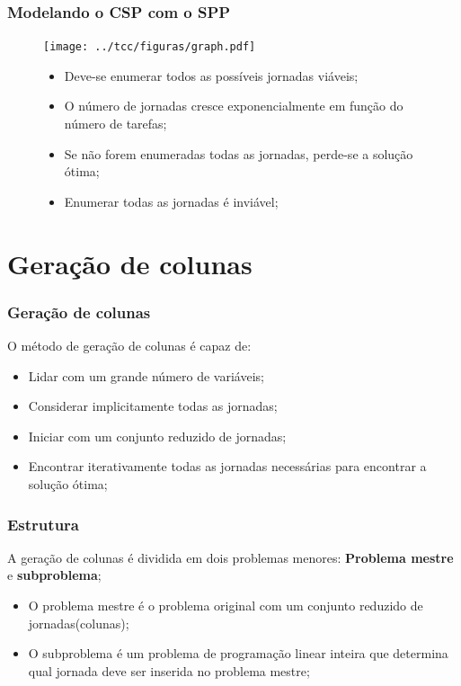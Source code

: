 \documentclass{beamer}
\begin{document}
\begin{frame}
    \frametitle{Modelando o CSP com o SPP}
    \begin{figure}[!htb]
        \centering
        \begin{minipage}{0.48\textwidth}
        {
            \centering
            \texttt{[image: ../tcc/figuras/graph.pdf]}
            \label{treta}
        }
        \end{minipage}
%
        \begin{minipage}{.48\textwidth}
            \begin{itemize}
                \item Deve-se enumerar todos as possíveis jornadas viáveis;
                \item O número de jornadas cresce exponencialmente em função do número de tarefas;
                \item Se não forem enumeradas todas as jornadas, perde-se a solução ótima;
                \item Enumerar todas as jornadas é inviável;
            \end{itemize}
        \end{minipage}
    \end{figure}
\end{frame}

\section{Geração de colunas}
\begin{frame}
    \frametitle{Geração de colunas}
    O método de geração de colunas é capaz de:

    \begin{itemize}
        \item Lidar com um grande número de variáveis;
        \item Considerar implicitamente todas as jornadas;
        \item Iniciar com um conjunto reduzido de jornadas;
        \item Encontrar iterativamente todas as jornadas necessárias para encontrar a solução ótima;
    \end{itemize}
\end{frame}

\begin{frame}
    \frametitle{Estrutura}

            A geração de colunas é dividida em dois problemas menores: \textbf{Problema mestre} e \textbf{subproblema};
    \begin{itemize}
        \item O problema mestre é o problema original com um conjunto reduzido de jornadas(colunas);
        \item O subproblema é um problema de programação linear inteira que determina qual jornada
            deve ser inserida no problema mestre;
    \end{itemize}
\end{frame}
\end{document}
